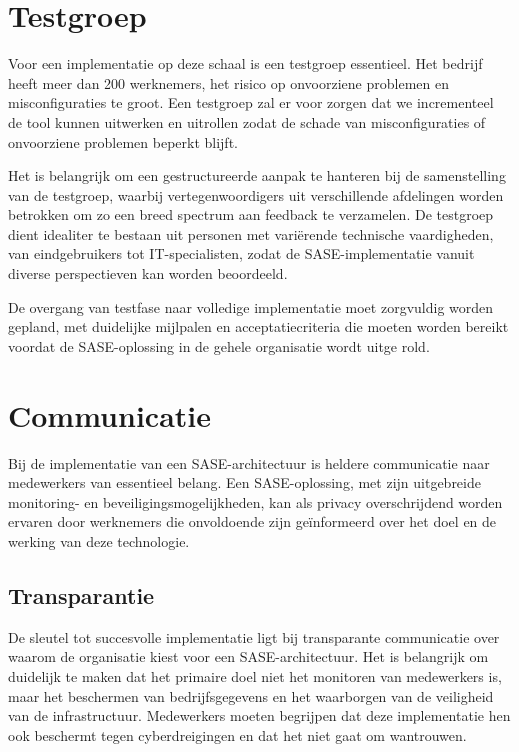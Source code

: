 \section{Testgroep}
Voor een implementatie op deze schaal is een testgroep essentieel. Het bedrijf heeft meer dan 200 werknemers, het risico op onvoorziene problemen en misconfiguraties te groot. Een testgroep zal er voor zorgen dat we incrementeel de tool kunnen uitwerken en uitrollen zodat de schade van misconfiguraties of onvoorziene problemen beperkt blijft.

\vspace{2ex}

Het is belangrijk om een gestructureerde aanpak te hanteren bij de samenstelling van de testgroep, waarbij vertegenwoordigers uit verschillende afdelingen worden betrokken om zo een breed spectrum aan feedback te verzamelen. De testgroep dient idealiter te bestaan uit personen met variërende technische vaardigheden, van eindgebruikers tot IT-specialisten, zodat de SASE-implementatie vanuit diverse perspectieven kan worden beoordeeld.

\vspace{2ex}

De overgang van testfase naar volledige implementatie moet zorgvuldig worden gepland, met duidelijke mijlpalen en acceptatiecriteria die moeten worden bereikt voordat de SASE-oplossing in de gehele organisatie wordt uitge rold.

\section{Communicatie}
Bij de implementatie van een SASE-architectuur is heldere communicatie naar medewerkers van essentieel belang. Een SASE-oplossing, met zijn uitgebreide monitoring- en beveiligingsmogelijkheden, kan als privacy overschrijdend worden ervaren door werknemers die onvoldoende zijn geïnformeerd over het doel en de werking van deze technologie.

\subsection{Transparantie}
De sleutel tot succesvolle implementatie ligt bij transparante communicatie over waarom de organisatie kiest voor een SASE-architectuur. Het is belangrijk om duidelijk te maken dat het primaire doel niet het monitoren van medewerkers is, maar het beschermen van bedrijfsgegevens en het waarborgen van de veiligheid van de infrastructuur. Medewerkers moeten begrijpen dat deze implementatie hen ook beschermt tegen cyberdreigingen en dat het niet gaat om wantrouwen.

